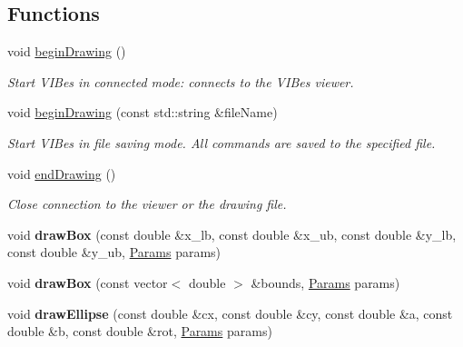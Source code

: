 \subsection*{Functions}
\begin{DoxyCompactItemize}
\item 
void \hyperlink{group__connection_ga8aabd902b41bbb5b865a3ba8be7ece76}{begin\+Drawing} ()
\begin{DoxyCompactList}\small\item\em Start V\+I\+Bes in connected mode\+: connects to the V\+I\+Bes viewer. \end{DoxyCompactList}\item 
void \hyperlink{group__connection_ga325194ea4b5f166c8e1dd975b5371e48}{begin\+Drawing} (const std\+::string \&file\+Name)
\begin{DoxyCompactList}\small\item\em Start V\+I\+Bes in file saving mode. All commands are saved to the specified file. \end{DoxyCompactList}\item 
void \hyperlink{group__connection_gacb8b0b5096e8457c761f228a017b1f6b}{end\+Drawing} ()
\begin{DoxyCompactList}\small\item\em Close connection to the viewer or the drawing file. \end{DoxyCompactList}\item 
\mbox{\label{namespacevibes_a78a5e45d9c9b8fe7f64a72b1a8c1321d}} 
void {\bfseries draw\+Box} (const double \&x\+\_\+lb, const double \&x\+\_\+ub, const double \&y\+\_\+lb, const double \&y\+\_\+ub, \hyperlink{classvibes_1_1_params}{Params} params)
\item 
\mbox{\label{namespacevibes_adf6e6c5774887eeb5cf85cdf910f4cad}} 
void {\bfseries draw\+Box} (const vector$<$ double $>$ \&bounds, \hyperlink{classvibes_1_1_params}{Params} params)
\item 
\mbox{\label{namespacevibes_ac59608fdfcb9a26430ab1df8dfbb1264}} 
void {\bfseries draw\+Ellipse} (const double \&cx, const double \&cy, const double \&a, const double \&b, const double \&rot, \hyperlink{classvibes_1_1_params}{Params} params)
\item 
\mbox{\label{namespacevibes_a56d8467fc1fac1858fdafab11559bd81}} 

\end{DoxyCompactItemize}
